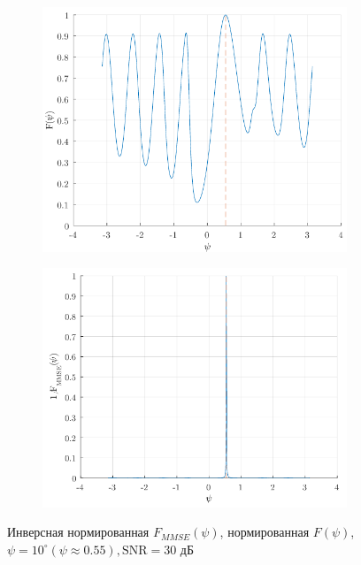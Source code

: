 \begin{figure}[htbp]
    \begin{subfigure}{0.49\linewidth}
        \centering
        \includegraphics[width=\linewidth]{figs/fig4.10a}
        \caption{}
        \label{fig:4.10a}
    \end{subfigure}
    \begin{subfigure}{0.49\linewidth}
        \centering
        \includegraphics[width=\linewidth]{figs/fig4.10b}
        \caption{}
        \label{fig:4.10b}
    \end{subfigure}
    \caption{  Инверсная нормированная $F_{MMSE}(\psi)$,  нормированная $F(\psi)$, $\psi=10^\circ(\psi \approx 0.55), \text{SNR}=30$ дБ}
\end{figure}

